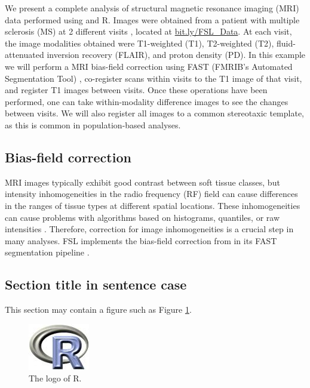 We present a complete analysis of structural magnetic resonance imaging
(MRI) data performed using  and R. Images were obtained from a
patient with multiple sclerosis (MS) at 2 different visits
\citep{sweeney_automatic_2013}, located at \url{bit.ly/FSL_Data}. At
each visit, the image modalities obtained were T1-weighted (T1),
T2-weighted (T2), fluid-attenuated inversion recovery (FLAIR), and
proton density (PD). In this example we will perform a MRI bias-field
correction using FAST (FMRIB's Automated Segmentation Tool)
\citep{zhang_segmentation_2001}, co-register scans within visits to the
T1 image of that visit, and register T1 images between visits. Once
these operations have been performed, one can take within-modality
difference images to see the changes between visits. We will also
register all images to a common stereotaxic template, as this is common
in population-based analyses.

\subsection{Bias-field correction}

MRI images typically exhibit good contrast between soft tissue classes,
but intensity inhomogeneities in the radio frequency (RF) field can
cause differences in the ranges of tissue types at different spatial
locations. These inhomogeneities can cause problems with algorithms
based on histograms, quantiles, or raw intensities
\citep{zhang_segmentation_2001}. Therefore, correction for image
inhomogeneities is a crucial step in many analyses. FSL implements the
bias-field correction from \citet{guillemaud_estimating_1997} in its
FAST segmentation pipeline \citep{zhang_segmentation_2001}.

\subsection{Section title in sentence
case}\label{section-title-in-sentence-case}

This section may contain a figure such as Figure \ref{figure:rlogo}.

\begin{figure}[htbp]
  \centering
  \includegraphics{Rlogo}
  \caption{The logo of R.}
  \label{figure:rlogo}
\end{figure}

